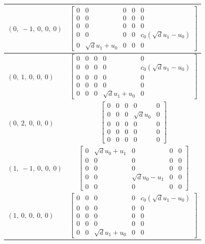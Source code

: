 \documentclass[11pt]{article}
\theoremstyle{definition}
\begin{document}
\begin{tabular}{|l|c|}
    \hline
    $\left( 0, \  -1, \  0, \  0, \  0\right)$ & $\left[\begin{matrix}0 & 0 & 0 & 0 & 0\\0 & 0 & 0 & 0 & 0\\0 & 0 & 0 & 0 & 0\\0 & 0 & 0 & 0 & c_{0} \left(\sqrt{d} u_{1} - u_{0}\right)\\0 & \sqrt{d} u_{1} + u_{0} & 0 & 0 & 0\end{matrix}\right]$ \\
    \hline
    $\left( 0, \  1, \  0, \  0, \  0\right)$ & $\left[\begin{matrix}0 & 0 & 0 & 0 & 0\\0 & 0 & 0 & 0 & c_{0} \left(\sqrt{d} u_{1} - u_{0}\right)\\0 & 0 & 0 & 0 & 0\\0 & 0 & 0 & 0 & 0\\0 & 0 & 0 & \sqrt{d} u_{1} + u_{0} & 0\end{matrix}\right]$ \\
    \hline
    $\left( 0, \  2, \  0, \  0, \  0\right)$ & $\left[\begin{matrix}0 & 0 & 0 & 0 & 0\\0 & 0 & 0 & \sqrt{d} u_{0} & 0\\0 & 0 & 0 & 0 & 0\\0 & 0 & 0 & 0 & 0\\0 & 0 & 0 & 0 & 0\end{matrix}\right]$ \\
    \hline
    $\left( 1, \  -1, \  0, \  0, \  0\right)$ & $\left[\begin{matrix}0 & \sqrt{d} u_{0} + u_{1} & 0 & 0 & 0\\0 & 0 & 0 & 0 & 0\\0 & 0 & 0 & 0 & 0\\0 & 0 & \sqrt{d} u_{0} - u_{1} & 0 & 0\\0 & 0 & 0 & 0 & 0\end{matrix}\right]$ \\
    \hline
    $\left( 1, \  0, \  0, \  0, \  0\right)$ & $\left[\begin{matrix}0 & 0 & 0 & 0 & c_{0} \left(\sqrt{d} u_{1} - u_{0}\right)\\0 & 0 & 0 & 0 & 0\\0 & 0 & 0 & 0 & 0\\0 & 0 & 0 & 0 & 0\\0 & 0 & \sqrt{d} u_{1} + u_{0} & 0 & 0\end{matrix}\right]$ \\

\end{tabular}
\end{document}
